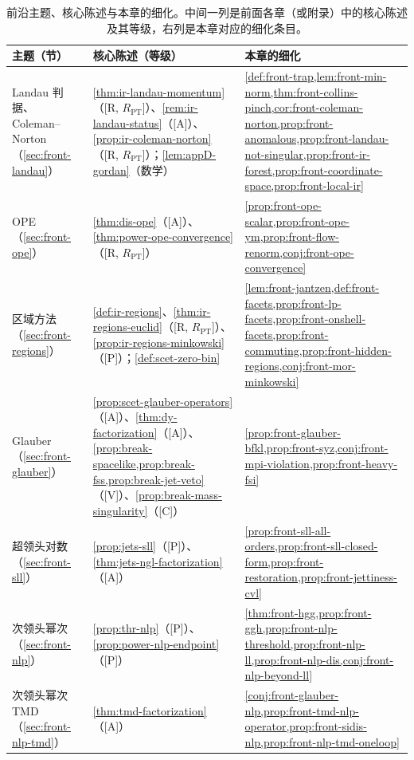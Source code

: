 \begin{table}[htbp]
\centering
\caption{前沿主题、核心陈述与本章的细化。中间一列是前面各章（或附录）中的核心陈述及其等级，右列是本章对应的细化条目。}\label{tab:front-map}
\small
\renewcommand{\arraystretch}{1.1}
\begin{tabularx}{\textwidth}{@{}p{2.4cm}>{\raggedright\arraybackslash}X>{\raggedright\arraybackslash}X@{}}
\toprule
主题（节） & 核心陈述（等级） & 本章的细化 \\
\midrule
Landau 判据、Coleman--Norton（\cref{sec:front-landau}） & \cref{thm:ir-landau-momentum}（[R, $R_{\mathrm{PT}}$]）、\cref{rem:ir-landau-status}（[A]）、\cref{prop:ir-coleman-norton}（[R, $R_{\mathrm{PT}}$]）；\cref{lem:appD-gordan}（数学） & \cref{def:front-trap,lem:front-min-norm,thm:front-collins-pinch,cor:front-coleman-norton,prop:front-anomalous,prop:front-landau-not-singular,prop:front-ir-forest,prop:front-coordinate-space,prop:front-local-ir} \\
OPE（\cref{sec:front-ope}） & \cref{thm:dis-ope}（[A]）、\cref{thm:power-ope-convergence}（[R, $R_{\mathrm{PT}}$]） & \cref{prop:front-ope-scalar,prop:front-ope-ym,prop:front-flow-renorm,conj:front-ope-convergence} \\
区域方法（\cref{sec:front-regions}） & \cref{def:ir-regions}、\cref{thm:ir-regions-euclid}（[R, $R_{\mathrm{PT}}$]）、\cref{prop:ir-regions-minkowski}（[P]）；\cref{def:scet-zero-bin} & \cref{lem:front-jantzen,def:front-facets,prop:front-lp-facets,prop:front-onshell-facets,prop:front-commuting,prop:front-hidden-regions,conj:front-mor-minkowski} \\
Glauber（\cref{sec:front-glauber}） & \cref{prop:scet-glauber-operators}（[A]）、\cref{thm:dy-factorization}（[A]）、\cref{prop:break-spacelike,prop:break-fss,prop:break-jet-veto}（[V]）、\cref{prop:break-mass-singularity}（[C]） & \cref{prop:front-glauber-bfkl,prop:front-syz,conj:front-mpi-violation,prop:front-heavy-fsi} \\
超领头对数（\cref{sec:front-sll}） & \cref{prop:jets-sll}（[P]）、\cref{thm:jets-ngl-factorization}（[A]） & \cref{prop:front-sll-all-orders,prop:front-sll-closed-form,prop:front-restoration,prop:front-jettiness-cvl} \\
次领头幂次（\cref{sec:front-nlp}） & \cref{prop:thr-nlp}（[P]）、\cref{prop:power-nlp-endpoint}（[P]） & \cref{thm:front-hgg,prop:front-ggh,prop:front-nlp-threshold,prop:front-nlp-ll,prop:front-nlp-dis,conj:front-nlp-beyond-ll} \\
次领头幂次 TMD（\cref{sec:front-nlp-tmd}） & \cref{thm:tmd-factorization}（[A]） & \cref{conj:front-glauber-nlp,prop:front-tmd-nlp-operator,prop:front-sidis-nlp,prop:front-nlp-tmd-oneloop} \\

\end{tabularx}
\end{table}

